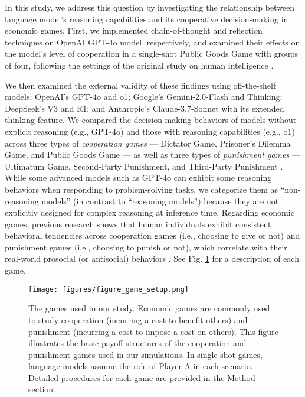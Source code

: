 In this study, we address this question by investigating the relationship between language model’s reasoning capabilities and its cooperative decision-making in economic games. 
First, we implemented chain-of-thought and reflection techniques on OpenAI GPT-4o model, respectively, and examined their effects on the model’s level of cooperation in a single-shot Public Goods Game with groups of four, following the settings of the original study on human intelligence \cite{rand2012spontaneous}.

We then examined the external validity of these findings using off-the-shelf models: OpenAI's GPT-4o and o1; Google's Gemini-2.0-Flash and Thinking; DeepSeek's V3 and R1; and Anthropic's Claude-3.7-Sonnet with its extended thinking feature. 
We compared the decision-making behaviors of models without explicit reasoning (e.g., GPT-4o) and those with reasoning capabilities (e.g., o1) across three types of \textit{cooperation games} --- Dictator Game, Prisoner’s Dilemma Game, and Public Goods Game --- as well as three types of \textit{punishment games} --- Ultimatum Game, Second-Party Punishment, and Third-Party Punishment \cite{camerer2011behavioral}.
While some advanced models such as GPT-4o can exhibit some reasoning behaviors when responding to problem-solving tasks, we categorize them as ``non-reasoning models'' (in contrast to ``reasoning models'') because they are not explicitly designed for complex reasoning at inference time.
Regarding economic games, previous research shows that human individuals exhibit consistent behavioral tendencies across cooperation games (i.e., choosing to give or not) and punishment games (i.e., choosing to punish or not), which correlate with their real-world prosocial (or antisocial) behaviors \cite{peysakhovich2014humans}.
See Fig. \ref{fig:game} for a description of each game. 

\begin{figure}[ht]
  \centering 
  \texttt{[image: figures/figure\_game\_setup.png]}
  \caption{The games used in our study. Economic games are commonly used to study cooperation (incurring a cost to benefit others) and punishment (incurring a cost to impose a cost on others). This figure illustrates the basic payoff structures of the cooperation and punishment games used in our simulations. In single-shot games, language models assume the role of Player A in each scenario. Detailed procedures for each game are provided in the Method section.}
  \label{fig:game}
\end{figure}

